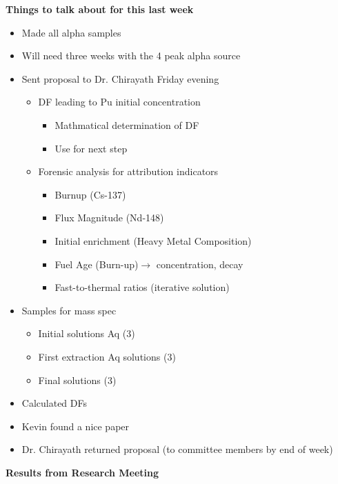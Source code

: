 \documentclass[idxtotoc,hyperref,openany,oneside]{labbook} %
\begin{document}
\textbf{Things to talk about for this last week}
\begin{itemize}
\item{Made all alpha samples}
\item{Will need three weeks with the 4 peak alpha source}
\item{Sent proposal to Dr. Chirayath Friday evening}
  \begin{itemize}
  \item{DF leading to Pu initial concentration}
    \begin{itemize}
    \item{Mathmatical determination of DF}
    \item{Use for next step}
    \end{itemize}
  \item{Forensic analysis for attribution indicators}
    \begin{itemize}
    \item{Burnup (Cs-137)}
    \item{Flux Magnitude (Nd-148)}
    \item{Initial enrichment (Heavy Metal Composition)}
    \item{Fuel Age (Burn-up)$\rightarrow$ concentration, decay}
    \item{Fast-to-thermal ratios (iterative solution)}
    \end{itemize}
  \end{itemize}
\item{Samples for mass spec}
  \begin{itemize}
  \item{Initial solutions Aq (3)}
  \item{First extraction Aq solutions (3)}
  \item{Final solutions (3)}
  \end{itemize}
\item{Calculated DFs}
\item{Kevin found a nice paper}
\item{Dr. Chirayath returned proposal (to committee members by end of week)}
\end{itemize}
\textbf{Results from Research Meeting}
\end{document}
